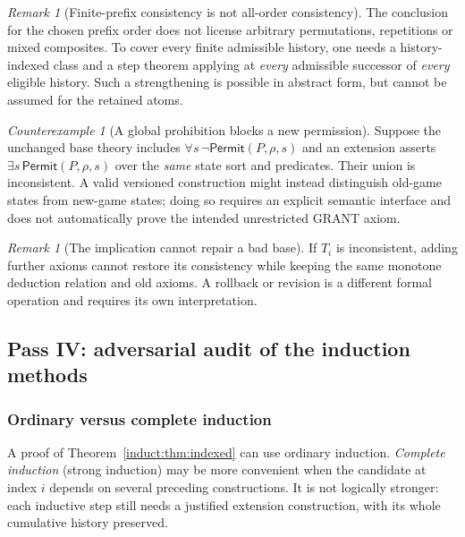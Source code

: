 \documentclass[11pt,letterpaper]{article}
\theoremstyle{definition}\newtheorem{definition}[theorem]{Definition}\newtheorem{example}[theorem]{Example}
\theoremstyle{remark}\newtheorem{remark}[theorem]{Remark}
\newtheorem{counterexample}[theorem]{Counterexample}
\begin{document}
\begin{remark}[Finite-prefix consistency is not all-order consistency]
The conclusion for the chosen prefix order does not license arbitrary permutations, repetitions or mixed composites. To cover every finite admissible history, one needs a history-indexed class and a step theorem applying at \emph{every} admissible successor of \emph{every} eligible history. Such a strengthening is possible in abstract form, but cannot be assumed for the retained atoms.
\end{remark}

\begin{counterexample}[A global prohibition blocks a new permission]
Suppose the unchanged base theory includes \(\forall s\,\neg\mathsf{Permit}(P,\rho,s)\) and an extension asserts \(\exists s\,\mathsf{Permit}(P,\rho,s)\) over the \emph{same} state sort and predicates. Their union is inconsistent. A valid versioned construction might instead distinguish old-game states from new-game states; doing so requires an explicit semantic interface and does not automatically prove the intended unrestricted GRANT axiom.
\end{counterexample}

\begin{remark}[The implication cannot repair a bad base]
If \(T_i\) is inconsistent, adding further axioms cannot restore its consistency while keeping the same monotone deduction relation and old axioms. A rollback or revision is a different formal operation and requires its own interpretation.
\end{remark}

\subsection{Pass IV: adversarial audit of the induction methods}

\subsubsection{Ordinary versus complete induction}

A proof of Theorem~\ref{induct:thm:indexed} can use ordinary induction. \emph{Complete induction} (strong induction) may be more convenient when the candidate at index \(i\) depends on several preceding constructions. It is not logically stronger: each inductive step still needs a justified extension construction, with its whole cumulative history preserved.
\end{document}
